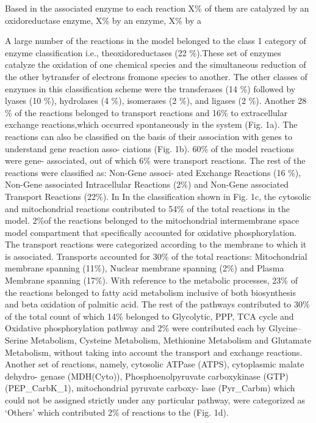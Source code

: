 Based in the associated enzyme to each reaction X\% of them are catalyzed by an oxidoreductase enzyme, X\% by an enzyme, X\% by a

A large number of the reactions in the model belonged to the class 1 category of enzyme classification i.e., theoxidoreductases (22 \%).These set of enzymes catalyze the oxidation of one chemical species and the simultaneous reduction of the other bytransfer of electrons fromone species to another. The other classes of enzymes in this classification scheme were the transferases (14 \%) followed by lyases (10 \%), hydrolases (4 \%), isomerases (2 \%), and ligases (2 \%). Another 28 \% of the reactions belonged to transport reactions and 16\% to extracellular exchange reactions,which occurred spontaneously in the system (Fig. 1a). The reactions can also be classified on the basis of their
association with genes to understand gene reaction asso- ciations (Fig. 1b). 60\% of the model reactions were gene- associated, out of which 6\% were transport reactions. 
The rest of the reactions were classified as: Non-Gene associ- ated Exchange Reactions (16 \%), Non-Gene associated Intracellular Reactions (2\%) and Non-Gene associated Transport Reactions (22\%). In In the classification shown in Fig. 1c, the cytosolic and
mitochondrial reactions contributed to 54\% of the total reactions in the model. 2\%of the reactions belonged to the mitochondrial intermembrane space model compartment that specifically accounted for oxidative phosphorylation. The transport reactions were categorized according to the membrane to which it is associated. Transports accounted for 30\% of the total reactions: Mitochondrial membrane spanning (11\%), Nuclear membrane spanning (2\%) and Plasma Membrane spanning (17\%). With reference to the metabolic processes, 23\% of the
reactions belonged to fatty acid metabolism inclusive of both biosynthesis and beta oxidation of palmitic acid. The rest of the pathways contributed to 30\% of the total count of which 14\% belonged to Glycolytic, PPP, TCA cycle and Oxidative phosphorylation pathway and 2\% were contributed each by Glycine–Serine Metabolism, Cysteine Metabolism, Methionine Metabolism and Glutamate Metabolism, without taking into account the transport and exchange reactions. Another set of reactions, namely, cytosolic ATPase (ATPS), cytoplasmic malate dehydro- genase (MDH(Cyto)), Phosphoenolpyruvate carboxykinase (GTP) (PEP\_CarbK\_1), mitochondrial pyruvate carboxy- lase (Pyr\_Carbm) which could not be assigned strictly under any particular pathway, were categorized as ‘Others’ which contributed 2\% of reactions to the (Fig. 1d).
